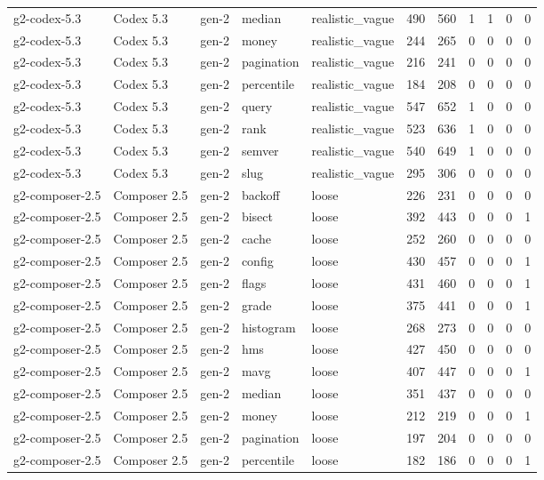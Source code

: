 \begin{tabular}{lllllllllll}
g2-codex-5.3 & Codex 5.3 & gen-2 & median & realistic\_vague & 490 & 560 & 1 & 1 & 0 & 0 \\
g2-codex-5.3 & Codex 5.3 & gen-2 & money & realistic\_vague & 244 & 265 & 0 & 0 & 0 & 0 \\
g2-codex-5.3 & Codex 5.3 & gen-2 & pagination & realistic\_vague & 216 & 241 & 0 & 0 & 0 & 0 \\
g2-codex-5.3 & Codex 5.3 & gen-2 & percentile & realistic\_vague & 184 & 208 & 0 & 0 & 0 & 0 \\
g2-codex-5.3 & Codex 5.3 & gen-2 & query & realistic\_vague & 547 & 652 & 1 & 0 & 0 & 0 \\
g2-codex-5.3 & Codex 5.3 & gen-2 & rank & realistic\_vague & 523 & 636 & 1 & 0 & 0 & 0 \\
g2-codex-5.3 & Codex 5.3 & gen-2 & semver & realistic\_vague & 540 & 649 & 1 & 0 & 0 & 0 \\
g2-codex-5.3 & Codex 5.3 & gen-2 & slug & realistic\_vague & 295 & 306 & 0 & 0 & 0 & 0 \\
g2-composer-2.5 & Composer 2.5 & gen-2 & backoff & loose & 226 & 231 & 0 & 0 & 0 & 0 \\
g2-composer-2.5 & Composer 2.5 & gen-2 & bisect & loose & 392 & 443 & 0 & 0 & 0 & 1 \\
g2-composer-2.5 & Composer 2.5 & gen-2 & cache & loose & 252 & 260 & 0 & 0 & 0 & 0 \\
g2-composer-2.5 & Composer 2.5 & gen-2 & config & loose & 430 & 457 & 0 & 0 & 0 & 1 \\
g2-composer-2.5 & Composer 2.5 & gen-2 & flags & loose & 431 & 460 & 0 & 0 & 0 & 1 \\
g2-composer-2.5 & Composer 2.5 & gen-2 & grade & loose & 375 & 441 & 0 & 0 & 0 & 1 \\
g2-composer-2.5 & Composer 2.5 & gen-2 & histogram & loose & 268 & 273 & 0 & 0 & 0 & 0 \\
g2-composer-2.5 & Composer 2.5 & gen-2 & hms & loose & 427 & 450 & 0 & 0 & 0 & 0 \\
g2-composer-2.5 & Composer 2.5 & gen-2 & mavg & loose & 407 & 447 & 0 & 0 & 0 & 1 \\
g2-composer-2.5 & Composer 2.5 & gen-2 & median & loose & 351 & 437 & 0 & 0 & 0 & 0 \\
g2-composer-2.5 & Composer 2.5 & gen-2 & money & loose & 212 & 219 & 0 & 0 & 0 & 1 \\
g2-composer-2.5 & Composer 2.5 & gen-2 & pagination & loose & 197 & 204 & 0 & 0 & 0 & 0 \\
g2-composer-2.5 & Composer 2.5 & gen-2 & percentile & loose & 182 & 186 & 0 & 0 & 0 & 1 \\

\end{tabular}
